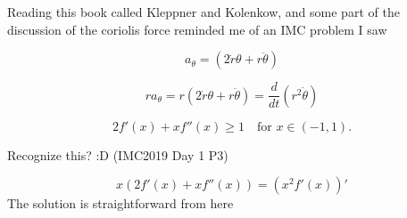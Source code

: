 \documentclass[11]{article}
\title{\sc{Proof of Cauchy-Schwarz by Brute Force}}
\author{\sc{Rahul}}
\date{\today}
\begin{document}
\maketitle

Reading this book called Kleppner and Kolenkow, and some part of the discussion of the coriolis force reminded me of an IMC problem I saw

$$a_\theta = (2 \dot r \theta + r \ddot \theta)$$

$$ra_\theta = r(2 \dot r \theta + r \ddot \theta) = \frac{d}{dt} (r^2 \dot \theta)$$

$$\displaystyle  {2f'(x)+xf''(x)\geq1} \quad\text{for \(\displaystyle x\in(-1,1)\)}.$$

Recognize this? :D (IMC2019 Day 1 P3)

$$x(2f'(x)+xf''(x)) = (x^2f'(x))' $$
The solution is straightforward from here
\end{document}
